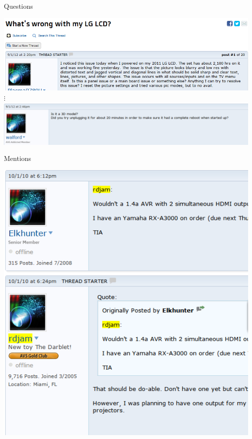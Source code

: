 \documentclass[12pt]{../presentation}
\begin{document}
\begin{frame}{Questions}
	\begin{center}
		\includegraphics[scale=0.4]{screenshots/question.png}\\
			$\vdots$\\
		\includegraphics[scale=0.4]{screenshots/question2.png}
	\end{center}
\end{frame}
\begin{frame}{Mentions}
	\begin{center}
		\includegraphics[scale=0.4]{screenshots/replies.png}\\
	\end{center}
\end{frame}
\end{document}
